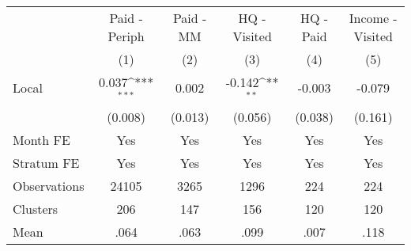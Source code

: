 {
\def\sym#1{\ifmmode^{#1}\else\(^{#1}\)\fi}
\begin{tabular}{l*{5}{c}}
\hline\hline
                &\multicolumn{1}{c}{Paid - Periph}&\multicolumn{1}{c}{Paid - MM}&\multicolumn{1}{c}{HQ - Visited}&\multicolumn{1}{c}{HQ - Paid}&\multicolumn{1}{c}{Income - Visited}\\
                &\multicolumn{1}{c}{(1)}         &\multicolumn{1}{c}{(2)}         &\multicolumn{1}{c}{(3)}         &\multicolumn{1}{c}{(4)}         &\multicolumn{1}{c}{(5)}         \\
\hline
Local           &    0.037\sym{***}&    0.002         &   -0.142\sym{**} &   -0.003         &   -0.079         \\
                &  (0.008)         &  (0.013)         &  (0.056)         &  (0.038)         &  (0.161)         \\
Month FE        &      Yes         &      Yes         &      Yes         &      Yes         &      Yes         \\
Stratum FE      &      Yes         &      Yes         &      Yes         &      Yes         &      Yes         \\
\hline
Observations    &    24105         &     3265         &     1296         &      224         &      224         \\
Clusters        &      206         &      147         &      156         &      120         &      120         \\
Mean            &     .064         &     .063         &     .099         &     .007         &     .118         \\
\hline\hline
\end{tabular}
}
